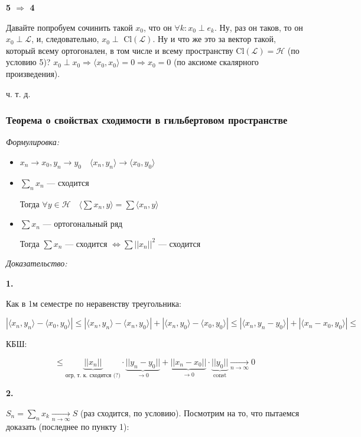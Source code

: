 \documentclass{article}
\def\goesto#1{\underset{#1}{\longrightarrow}}
\def\toinf#1{\goesto{#1 \rightarrow \infty}}
\def\ntoinf{\toinf{n}}
\def\sk#1#2{\langle #1, #2 \rangle}
\DeclareMathOperator{\const}{const}
\begin{document}
\textbf{5 $\Rightarrow$ 4}

Давайте попробуем сочинить такой $x_0$, что он $\forall k: x_0 \perp e_k$. Ну, раз он таков, то он $x_0 \perp \mathcal{L}$, и, следовательно, $x_0 \perp$ Cl$(\mathcal{L})$. Ну и что же это за вектор такой, который всему ортогонален, в том числе и всему пространству Cl$(\mathcal{L}) = \mathcal{H}$ (по условию 5)? $x_0 \perp x_0 \Rightarrow \sk{x_0}{x_0} = 0 \Rightarrow x_0 = 0$ (по аксиоме скалярного произведения).

ч. т. д. 

\newpage


\subsubsection{Теорема о свойствах сходимости в гильбертовом пространстве}
\textit{Формулировка:}

\begin{itemize}
    \item $x_n \rightarrow x_0, y_n \rightarrow y_0 \quad \langle x_n, y_n \rangle \rightarrow \langle x_0, y_0 \rangle$
    \item $\sum_n x_n$ --- сходится
    
    Тогда $\forall y \in \mathcal{H} \quad \langle \sum x_n , y\rangle = \sum \langle x_n, y \rangle$

    \item $\sum x_n$ --- ортогональный ряд
    
    Тогда $\sum x_n$ --- сходится $\Leftrightarrow \sum ||x_n||^2$ --- сходится
\end{itemize}

\textit{Доказательство:}

\textbf{1.}

Как в 1м семестре по неравенству треугольника:

\[|\sk{x_n}{y_n} -\sk{x_0}{y_0}| \le |\sk{x_n}{y_n} - \sk{x_n}{y_0}| + |\sk{x_n}{y_0} - \sk{x_0}{y_0}| \le |\sk{x_n}{y_n - y_0}| + |\sk{x_n - x_0}{y_0}| \le \]

КБШ:

\[ \le \underbrace{||x_n||}_{\text{огр, т. к. сходится (?)}} \cdot \underbrace{||y_n - y_0||}_{\rightarrow 0} + \underbrace{||x_n - x_0||}_{\rightarrow 0} \cdot \underbrace{||y_0||}_{\const} \ntoinf 0\]

\textbf{2.}

$S_n = \sum_n x_k \ntoinf S$ (раз сходится, по условию). Посмотрим на то, что пытаемся доказать (последнее по пункту 1):
\end{document}
